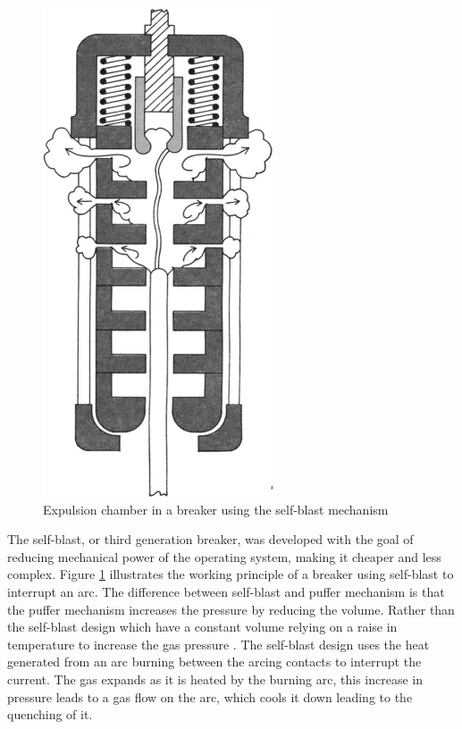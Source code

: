 \documentclass[10pt,a4paper]{article} %
\begin{document}
\begin{figure} [h]
\centering
\includegraphics[scale=0.4]{Bilder/Theory/selfBlast.png}
\caption{Expulsion chamber in a breaker using the self-blast mechanism \cite{bib:CBAC}} \label{fig:selfBlast}
\end{figure}

The self-blast, or third generation breaker, was developed with the goal of reducing mechanical power of the operating system, making it cheaper and less complex. Figure \ref{fig:selfBlast} illustrates the working principle of a breaker using self-blast to interrupt an arc. The difference between self-blast and puffer mechanism is that the puffer mechanism increases the pressure by reducing the volume. Rather than the self-blast design which have a constant volume relying on a raise in temperature to increase the gas pressure \cite{bib:CBAC}. The self-blast design uses the heat generated from an arc burning between the arcing contacts to interrupt the current. The gas expands as it is heated by the burning arc, this increase in pressure leads to a gas flow on the arc, which cools it down leading to the quenching of it.
\end{document}
